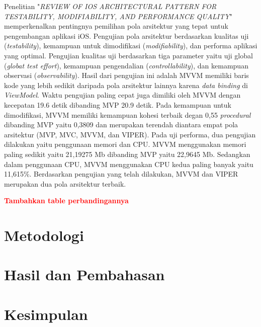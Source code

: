 \documentclass[conference]{IEEEtran}
\begin{document}
	Penelitian "\textit{REVIEW OF IOS ARCHITECTURAL PATTERN FOR
		TESTABILITY, MODIFIABILITY, AND PERFORMANCE QUALITY}" \cite{fz2019} memperkenalkan pentingnya pemilihan pola arsitektur yang tepat untuk pengembangan aplikasi iOS. Pengujian pola arsitektur berdasarkan kualitas uji (\textit{testability}), kemampuan untuk dimodifikasi (\textit{modifiability}), dan performa aplikasi yang optimal. Pengujian kualitas uji berdasarkan tiga parameter yaitu uji global (\textit{globat test effort}), kemampuan pengendalian (\textit{controllability}), dan kemampuan observasi (\textit{observability}). Hasil dari pengujian ini adalah MVVM memiliki baris kode yang lebih sedikit daripada pola arsitektur lainnya karena \textit{data binding} di \textit{ViewModel}. Waktu pengujian paling cepat juga dimiliki oleh MVVM dengan kecepatan 19.6 detik dibanding MVP 20.9 detik. Pada kemampuan untuk dimodifikasi, MVVM memiliki kemampuan kohesi terbaik degan 0,55 \textit{procedural} dibanding MVP yaitu 0,3809 dan merupakan terendah diantara empat pola arsitektur (MVP, MVC, MVVM, dan VIPER). Pada uji performa, dua pengujian dilakukan yaitu penggunaan memori dan CPU. MVVM menggunakan memori paling sedikit yaitu 21,19275 Mb dibanding MVP yaitu 22,9645 Mb. Sedangkan dalam penggunaan CPU, MVVM menggunakan CPU kedua paling banyak yaitu 11,615\%. Berdasarkan pengujian yang telah dilakukan, MVVM dan VIPER merupakan dua pola arsitektur terbaik.
	
	\textbf{\textcolor{red}{Tambahkan table perbandingannya}}
	
	\section{Metodologi}
	
	
	\section{Hasil dan Pembahasan}
	
	
	\section{Kesimpulan}
	
	
	
\end{document}
